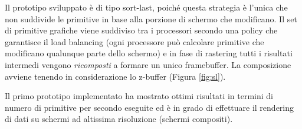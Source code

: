 Il prototipo sviluppato è di tipo sort-last, poiché questa strategia è l'unica che non suddivide le primitive in base alla porzione di schermo che modificano.
Il set di primitive grafiche viene suddiviso tra i processori secondo una policy che garantisce il load balancing (ogni processore può calcolare primitive che modificano qualunque parte dello schermo) e in fase di rastering tutti i risultati intermedi vengono \textit{ricomposti} a formare un unico framebuffer. La composizione avviene tenendo in considerazione lo z-buffer (Figura \ref{fig:sl}).

Il primo prototipo implementato ha mostrato ottimi risultati in termini di numero di primitive per secondo eseguite ed è in grado di effettuare il rendering di dati su schermi ad altissima risoluzione (schermi compositi). 



